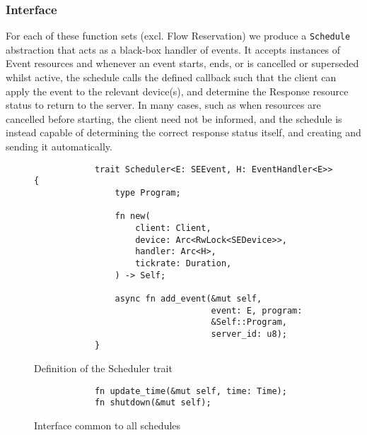 \subsubsection{Interface}

For each of these function sets (excl. Flow Reservation) we produce a \texttt{Schedule} abstraction that acts as a black-box handler of events. It accepts instances of Event resources and whenever an event starts, ends, or is cancelled or superseded whilst active, the schedule calls the defined callback such that the client can apply the event to the relevant device(s), and determine the Response resource status to return to the server. In many cases, such as when resources are cancelled before starting, the client need not be informed, and the schedule is instead capable of determining the correct response status itself, and creating and sending it automatically.

\begin{figure}[h]
    \begin{center}
        \begin{lstlisting}
            trait Scheduler<E: SEEvent, H: EventHandler<E>> {
                type Program;

                fn new(
                    client: Client,
                    device: Arc<RwLock<SEDevice>>,
                    handler: Arc<H>,
                    tickrate: Duration,
                ) -> Self;

                async fn add_event(&mut self, 
                                   event: E, program:
                                   &Self::Program, 
                                   server_id: u8);
            }
        \end{lstlisting}
        \label{fig:schedulertrait}
        \vspace{-10pt}
        \caption{Definition of the Scheduler trait}
    \end{center}
\end{figure}

\begin{figure}[h]
    \begin{center}
        \begin{lstlisting}
            fn update_time(&mut self, time: Time);
            fn shutdown(&mut self);
        \end{lstlisting}
        \label{fig:schedulerimpl}
        \vspace{-10pt}
        \caption{Interface common to all schedules}
    \end{center}
\end{figure}

